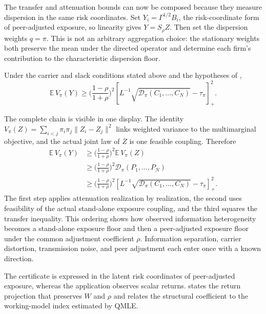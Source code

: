 The transfer and attenuation bounds can now be composed because they
measure dispersion in the same risk coordinates.
Set $Y_i=\Gamma^{1/2}B_i$, the risk-coordinate form of peer-adjusted
exposure, so linearity gives $Y=S_\rho Z$.
Then set the dispersion weights $q=\pi$.
This is not an arbitrary aggregation choice: the stationary weights
both preserve the mean under the directed operator and determine each
firm's contribution to the characteristic dispersion floor.
\begin{corollary}
  \label{cor:spatial-dispersion-certificate}
  Under the carrier and slack conditions stated above and the hypotheses of
  ,
  \begin{equation}\label{eq:spatial-dispersion-certificate}
    \mathbb E\,V_\pi(Y)
    \geq
    \Big(\frac{1-\rho}{1+\rho}\Big)^2
    \left[L^{-1}\sqrt{\mathcal D_\pi(C_1,\dots,C_N)}-\tau_\pi\right]_+^2.
  \end{equation}
\end{corollary}
The complete chain is visible in one display.
The identity $V_\pi(Z)=\sum_{i<j}\pi_i\pi_j\lVert Z_i-Z_j\rVert^2$
links weighted variance to the multimarginal objective, and the
actual joint law of $Z$ is one feasible coupling.
Therefore
\[
  \begin{aligned}
    \mathbb E\,V_\pi(Y)
    &\geq
    \Big(\frac{1-\rho}{1+\rho}\Big)^2\mathbb E\,V_\pi(Z) \\
    &\geq
    \Big(\frac{1-\rho}{1+\rho}\Big)^2
    \mathcal D_\pi(P_1,\ldots,P_N) \\
    &\geq
    \Big(\frac{1-\rho}{1+\rho}\Big)^2
    \left[
      L^{-1}\sqrt{\mathcal D_\pi(C_1,\ldots,C_N)}-\tau_\pi
    \right]_+^2.
  \end{aligned}
\]
The first step applies attenuation realization by realization, the
second uses feasibility of the actual stand-alone exposure coupling,
and the third squares the transfer inequality.
This ordering shows how observed information heterogeneity becomes a
stand-alone exposure floor and then a peer-adjusted exposure floor
under the common adjustment coefficient $\rho$.
Information separation, carrier distortion, transmission noise, and
peer adjustment each enter once with a known direction.

The certificate is expressed in the latent risk coordinates of
peer-adjusted exposure, whereas the application observes scalar returns.
 states the return projection that
preserves $W$ and $\rho$ and relates the structural coefficient to the
working-model index estimated by QMLE.
